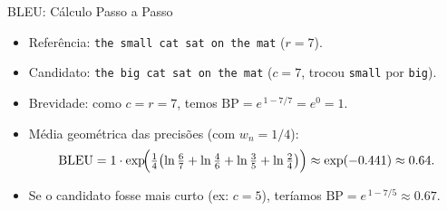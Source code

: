 \documentclass[aspectratio=169,xcolor=dvipsnames]{beamer}
\begin{document}
\begin{frame}{BLEU: Cálculo Passo a Passo}
\begin{itemize}
    \item Referência: \texttt{the \textcolor{red!70!black}{small} cat sat on the mat} \quad ($r = 7$).
    \item Candidato: \texttt{the \textcolor{red!70!black}{big} cat sat on the mat} \quad ($c = 7$, trocou \texttt{\textcolor{red!70!black}{small}} por \texttt{\textcolor{red!70!black}{big}}).
\end{itemize}
\vspace{0.2em}
\centering
{}
\vspace{0.3em}
\begin{itemize}
    \item Brevidade: como $c = r = 7$, temos $\text{BP} = e^{\,1 - 7/7} = e^0 = 1$.
    \item Média geométrica das precisões (com $w_n = 1/4$):
    \begin{equation*}
        \text{BLEU} = 1 \cdot \exp\!\Bigl(\tfrac{1}{4}\bigl(\ln\tfrac{6}{7} + \ln\tfrac{4}{6} + \ln\tfrac{3}{5} + \ln\tfrac{2}{4}\bigr)\Bigr) \approx \exp(-0.441) \approx 0.64.
    \end{equation*}
    \item Se o candidato fosse mais curto (ex: $c = 5$), teríamos $\text{BP} = e^{\,1 - 7/5} \approx 0.67$.
\end{itemize}
\end{frame}
\end{document}
